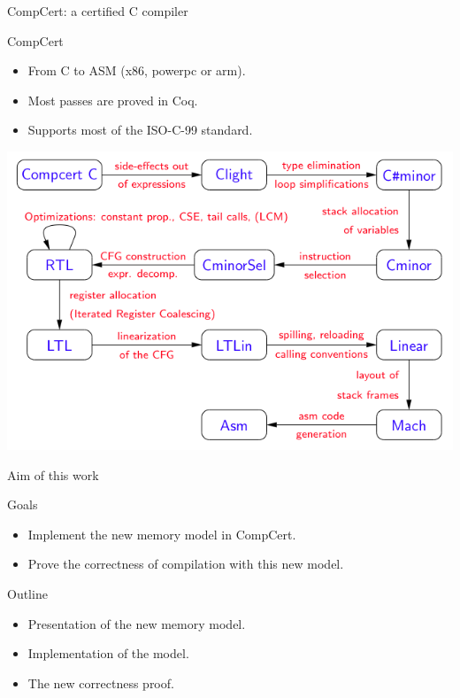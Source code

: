 \begin{frame}{CompCert: a certified C compiler}

  \begin{block}{CompCert}
    \begin{itemize}
      \item From C to ASM (x86, powerpc or arm).
      \item Most passes are proved in Coq.
      \item Supports most of the ISO-C-99 standard.
    \end{itemize}
  \end{block}
  \vfill
  \begin{center}
    \includegraphics[scale=0.6]{img/passes.png}
  \end{center}
  
\end{frame}


\begin{frame}{Aim of this work}
  
  \begin{block}{Goals}
    \begin{itemize}
    \item Implement the new memory model in CompCert.
    \item Prove the correctness of compilation with this new model.
    \end{itemize}
  \end{block}
  \vfill
  \begin{block}{Outline}
    \begin{itemize}
    \item Presentation of the new memory model.
    \item Implementation of the model.
    \item The new correctness proof.
    \end{itemize}
  \end{block}
  
\end{frame}
